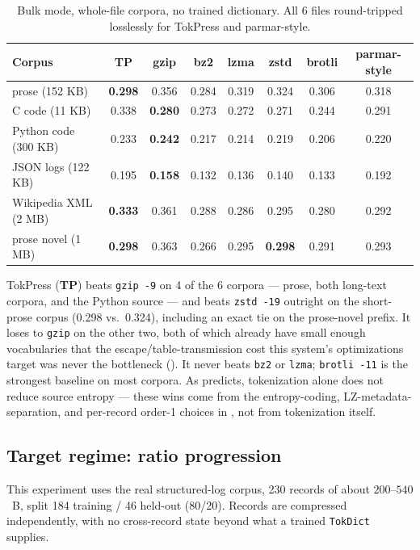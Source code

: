 \documentclass[10pt,twocolumn]{article}
\theoremstyle{plain}
\theoremstyle{definition}
\begin{document}
\begin{table}[t]
\centering\small
\caption{Bulk mode, whole-file corpora, no trained dictionary. All 6 files
round-tripped losslessly for TokPress and parmar-style.}
\label{tab:bulk}
\begin{tabular}{@{}lccccccc@{}}
\toprule
Corpus & \textbf{TP} & gzip & bz2 & lzma & zstd & brotli & parmar-style \\
\midrule
prose (152 KB)          & \textbf{0.298} & 0.356 & 0.284 & 0.319 & 0.324 & 0.306 & 0.318 \\
C code (11 KB)          & 0.338 & \textbf{0.280} & 0.273 & 0.272 & 0.271 & 0.244 & 0.291 \\
Python code (300 KB)    & 0.233 & \textbf{0.242} & 0.217 & 0.214 & 0.219 & 0.206 & 0.220 \\
JSON logs (122 KB)      & 0.195 & \textbf{0.158} & 0.132 & 0.136 & 0.140 & 0.133 & 0.192 \\
Wikipedia XML (2 MB)    & \textbf{0.333} & 0.361 & 0.288 & 0.286 & 0.295 & 0.280 & 0.292 \\
prose novel (1 MB)      & \textbf{0.298} & 0.363 & 0.266 & 0.295 & \textbf{0.298} & 0.291 & 0.293 \\
\bottomrule
\end{tabular}
\end{table}

TokPress (\textbf{TP}) beats \texttt{gzip -9} on 4 of the 6 corpora --- prose, both
long-text corpora, and the Python source --- and beats \texttt{zstd -19} outright on
the short-prose corpus (0.298 vs.\ 0.324), including an exact tie on the prose-novel
prefix. It loses to \texttt{gzip} on the other two, both of which already have small
enough vocabularies that the escape/table-transmission cost this system's
optimizations target was never the bottleneck (). It never beats
\texttt{bz2} or \texttt{lzma}; \texttt{brotli -11} is the strongest baseline on most
corpora. As  predicts, tokenization alone does not reduce
source entropy --- these wins come from the entropy-coding, LZ-metadata-separation,
and per-record order-1 choices in , not from tokenization itself.

\subsection{Target regime: ratio progression}\label{sec:target}

This experiment uses the real structured-log corpus, 230 records of about $200$--$540$\,
B, split 184 training / 46 held-out (80/20). Records are compressed independently,
with no cross-record state beyond what a trained \texttt{TokDict} supplies.
\end{document}
